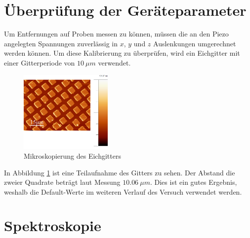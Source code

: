     \section{Überprüfung der Geräteparameter}

Um Entfernungen auf Proben messen zu können, müssen die an den Piezo angelegten 
Spannungen zuverlässig in $x$, $y$ und $z$ Auslenkungen umgerechnet werden können.
Um diese Kalibrierung zu überprüfen, wird ein Eichgitter mit einer Gitterperiode
von  $\SI{10}{\mu m}$ verwendet.
\begin{figure}[hb]
    \centering
    \includegraphics[width=0.4\textwidth]{Mess/gitter_paint.png}
    \caption{Mikroskopierung des Eichgitters}
    \label{gitter}
\end{figure}
In Abbildung \ref{gitter} ist eine Teilaufnahme des Gitters zu sehen. Der Abstand die 
zweier Quadrate beträgt laut Messung $\SI{10,06}{\mu m}$. Dies ist ein gutes 
Ergebnis, weshalb die Default-Werte im weiteren Verlauf des Versuch verwendet 
werden.

    \section{Spektroskopie}


